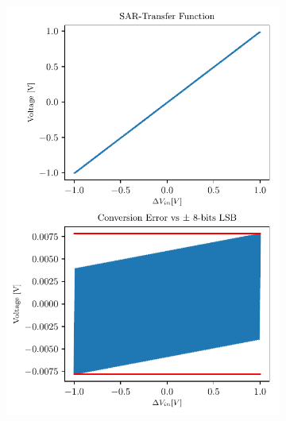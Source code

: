 \begin{figure}[htp]
	\centering
	\begin{subfigure}[b]{0.4\textwidth}
		\centering
		\includegraphics[width=\textwidth]{Chapter4/Figs/results/sar_resilience/sar-osr6-ideal.pdf}
	\end{subfigure}
	\begin{subfigure}[b]{0.4\textwidth}
		\centering

\end{subfigure}
\end{figure}
